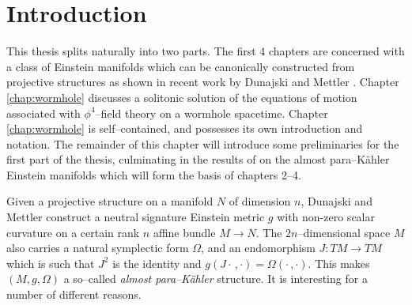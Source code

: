 

\chapter{Introduction}\label{chap:intro}


This thesis splits naturally into two parts. The first 4 chapters are concerned with a class of Einstein manifolds which can be canonically constructed from projective structures as shown in recent work by Dunajski and Mettler \cite{DM}. Chapter \ref{chap:wormhole} discusses a solitonic solution of the equations of motion associated with $\phi^4$--field theory on a wormhole spacetime. Chapter \ref{chap:wormhole} is self--contained, and possesses its own introduction and notation. The remainder of this chapter will introduce some preliminaries for the first part of the thesis, culminating in the results of \cite{DM} on the almost para--K\"ahler Einstein manifolds which will form the basis of chapters 2--4.



Given a projective structure on a manifold $N$ of dimension $n$,
Dunajski and Mettler \cite{DM} construct a neutral signature Einstein metric $g$ with non-zero
scalar curvature on a certain rank $n$ affine bundle $M\rightarrow N$.
The $2n$--dimensional space $M$ also carries a natural symplectic form $\Omega$, and an endomorphism $J:TM\rightarrow TM$ which is such that $J^2$ is the identity and $g(J\cdot\,,\cdot)=\Omega(\cdot\,,\cdot)$. This makes $(M,g,\Omega)$ a so--called \textit{almost para--K\"ahler} structure. It is interesting for a number of different reasons.

